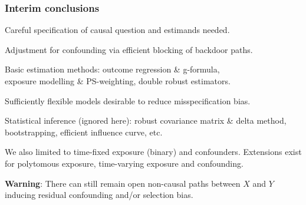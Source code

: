 \documentclass[12pt,dvipsnames,t,aspectratio=169, handout%
]{beamer}
\begin{document}
\begin{frame}
\frametitle{\large Interim conclusions}

\bi
\item 
Careful specification of causal question and estimands needed.
\pause
\medskip
\item 
Adjustment for confounding via efficient blocking of backdoor paths.
\pause
\medskip
\item
Basic estimation methods: outcome regression \& g-formula, \\ 
exposure modelling \& PS-weighting,
 double robust estimators.
\pause 
\medskip
\item
Sufficiently flexible models desirable to reduce misspecification bias.
\pause
\medskip
\item 
Statistical inference (ignored here): robust covariance matrix \& delta method, bootstrapping,
efficient influence curve, etc.  
\pause
\medskip
\item
We also limited to time-fixed exposure (binary) and confounders.
Extensions exist for
 polytomous exposure, time-varying exposure and confounding.
 \pause
 \medskip
 \item
\textbf{Warning}: There can still remain open non-causal paths between $X$ and $Y$ 
inducing residual confounding and/or selection bias.
\ei

\end{frame}
\end{document}
